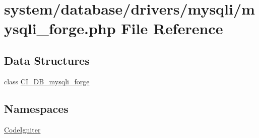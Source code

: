 \hypertarget{mysqli__forge_8php}{}\section{system/database/drivers/mysqli/mysqli\+\_\+forge.php File Reference}
\label{mysqli__forge_8php}
\subsection*{Data Structures}
\begin{DoxyCompactItemize}
\item 
class \mbox{\hyperlink{class_c_i___d_b__mysqli__forge}{C\+I\+\_\+\+D\+B\+\_\+mysqli\+\_\+forge}}
\end{DoxyCompactItemize}
\subsection*{Namespaces}
\begin{DoxyCompactItemize}
\item 
 \mbox{\hyperlink{namespace_code_igniter}{Code\+Igniter}}
\end{DoxyCompactItemize}
